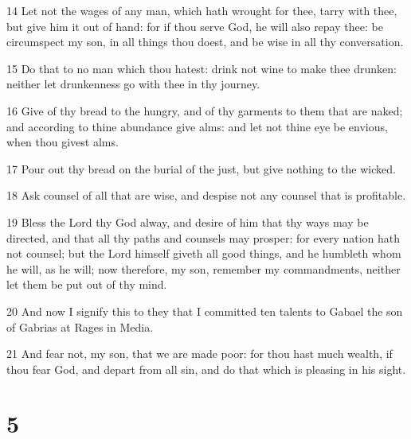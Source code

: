 \par 14 Let not the wages of any man, which hath wrought for thee, tarry with thee, but give him it out of hand: for if thou serve God, he will also repay thee: be circumspect my son, in all things thou doest, and be wise in all thy conversation.
\par 15 Do that to no man which thou hatest: drink not wine to make thee drunken: neither let drunkenness go with thee in thy journey.
\par 16 Give of thy bread to the hungry, and of thy garments to them that are naked; and according to thine abundance give alms: and let not thine eye be envious, when thou givest alms.
\par 17 Pour out thy bread on the burial of the just, but give nothing to the wicked.
\par 18 Ask counsel of all that are wise, and despise not any counsel that is profitable.
\par 19 Bless the Lord thy God alway, and desire of him that thy ways may be directed, and that all thy paths and counsels may prosper: for every nation hath not counsel; but the Lord himself giveth all good things, and he humbleth whom he will, as he will; now therefore, my son, remember my commandments, neither let them be put out of thy mind.
\par 20 And now I signify this to they that I committed ten talents to Gabael the son of Gabrias at Rages in Media.
\par 21 And fear not, my son, that we are made poor: for thou hast much wealth, if thou fear God, and depart from all sin, and do that which is pleasing in his sight.

\chapter{5}

